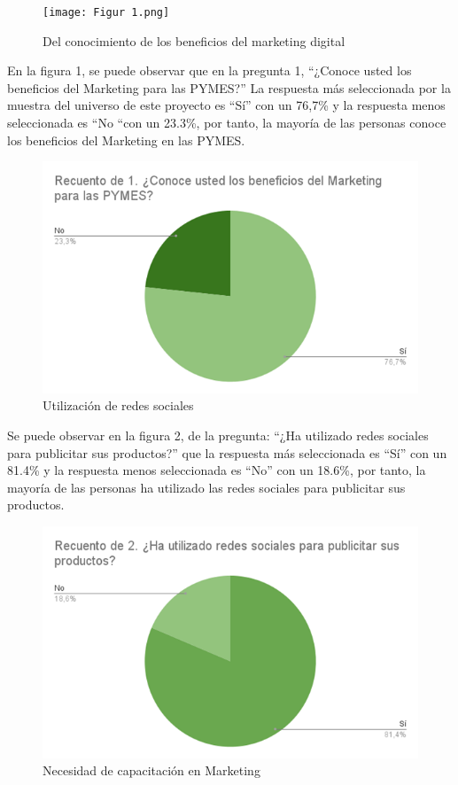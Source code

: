 \documentclass[12pt]{difu100cia} %
\begin{document}
\begin{figure}[!htb]
	\centering
	\texttt{[image: Figur 1.png]}
	\caption{Del conocimiento de los beneficios del marketing digital}
	\label{Figur 1}
\end{figure}
	

En la figura 1, se puede observar que en la pregunta 1, “¿Conoce usted los beneficios del Marketing para las PYMES?” La respuesta más seleccionada por la muestra del universo de este proyecto es “Sí” con un 76,7\% y la respuesta menos seleccionada es “No “con un 23.3\%, por tanto, la mayoría de las personas conoce los beneficios del Marketing en las PYMES.

\begin{figure}[!htb]
	\centering
	\includegraphics[width=\linewidth]{Figura 2.png}
	\caption{Utilización de redes sociales}
	\label{Figur 2}
\end{figure}
	
Se puede observar en la figura 2, de la pregunta: “¿Ha utilizado redes sociales para publicitar sus productos?” que la respuesta más seleccionada es “Sí” con un 81.4\% y la respuesta menos seleccionada es “No” con un 18.6\%, por tanto, la mayoría de las personas ha utilizado las redes sociales para publicitar sus productos.

\begin{figure}[!htb]
	\centering
	\includegraphics[width=\linewidth]{Figura 3.png}
	\caption{Necesidad de capacitación en Marketing}
	\label{Figur 3}
\end{figure}
	
\end{document}
